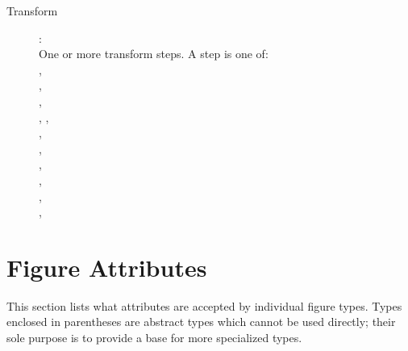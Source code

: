 \begin{description}
\item[Transform]: \\
One or more transform steps. A step is one of: \\
, \\
, \\
, \\
, , \\
, \\
, \\
, \\
, \\
, \\
, \\

\end{description}



\section{Figure Attributes}

This section lists what attributes are accepted by individual figure types.
Types enclosed in parentheses are abstract types which cannot be used
directly; their sole purpose is to provide a base for more specialized
types.

